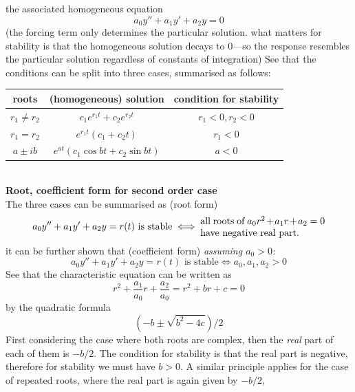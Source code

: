 \documentclass{report}
\begin{document}
the associated homogeneous equation
\begin{equation*}
a_0y''+a_1y'+a_2y=0
\end{equation*}
(the forcing term only determines the particular solution. what matters for stability is that the homogeneous
solution decays to 0---so the response resembles the particular solution regardless of constants of integration) 
See that the conditions can be split into three cases, summarised as follows:
\begin{table}[h]
\begin{center}
\begin{tabular}{c c c}
\hline
roots & (homogeneous) solution & condition for stability\\
\hline
$r_1\neq r_2$&$c_1e^{r_1t}+c_2e^{r_2t}$&$r_1<0,r_2<0$\\
$r_1=r_2$&$e^{r_1t}(c_1+c_2t)$&$r_1<0$\\
$a\pm ib$&$e^{at}(c_1\cos bt+c_2\sin bt)$&$a<0$\\
\hline
\end{tabular}
\end{center}
\end{table}\\
\textbf{Root, coefficient form for second order case}\\
The three cases can be summarised as (root form)
\begin{equation*}
a_0y''+a_1y'+a_2y=r(t)\text{ is stable}\iff\parbox{13em}{all roots of $a_0r^2+a_1r+a_2=0$\\
have negative real part.}
\end{equation*}
it can be further shown that (coefficient form) \textit{assuming $a_0>0$:}
\begin{equation*}
a_0y''+a_1y'+a_2y=r(t)\text{ is stable}\iff a_0,a_1,a_2>0
\end{equation*}
See that the characteristic equation can be written as
\begin{equation*}
r^2+\frac{a_1}{a_0}r+\frac{a_2}{a_0}=r^2+br+c=0
\end{equation*}
by the quadratic formula
\begin{equation*}
(-b\pm\sqrt{b^2-4c})/2
\end{equation*}
First considering the case where both roots are complex, then the \textit{real} part of each of them is $-b/2$.
The condition for stability is that the real part is negative, therefore for stability we must have $b>0$. 
A similar principle applies for the case of repeated roots, where the real part is again given by $-b/2$, 
\end{document}
